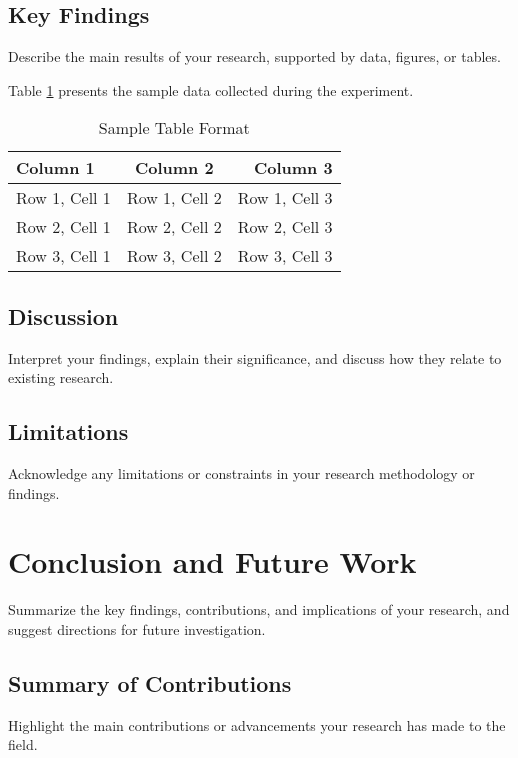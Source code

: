 \section{Key Findings}
Describe the main results of your research, supported by data, figures, or tables.

Table \ref{tab:sample_table} presents the sample data collected during the experiment.

\begin{table}[ht]
    \centering
    \caption{Sample Table Format}  %
    \label{tab:sample_table}       %
    \begin{tabular}{|l|c|r|}       %
        \hline
        \textbf{Column 1} & \textbf{Column 2} & \textbf{Column 3} \\
        \hline
        Row 1, Cell 1     & Row 1, Cell 2     & Row 1, Cell 3     \\
        Row 2, Cell 1     & Row 2, Cell 2     & Row 2, Cell 3     \\
        Row 3, Cell 1     & Row 3, Cell 2     & Row 3, Cell 3     \\
        \hline
    \end{tabular}
\end{table}

\section{Discussion}
Interpret your findings, explain their significance, and discuss how they relate to existing research.

\section{Limitations}
Acknowledge any limitations or constraints in your research methodology or findings.

\chapter{Conclusion and Future Work}
Summarize the key findings, contributions, and implications of your research, and suggest directions for future investigation.

\section{Summary of Contributions}
Highlight the main contributions or advancements your research has made to the field.

